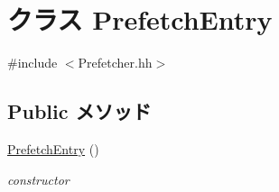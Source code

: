 \hypertarget{classPrefetchEntry}{
\section{クラス PrefetchEntry}
\label{classPrefetchEntry}
}


{\ttfamily \#include $<$Prefetcher.hh$>$}\subsection*{Public メソッド}
\begin{DoxyCompactItemize}
\item 
\hyperlink{classPrefetchEntry_a50ec5ab4d2e06f3dbfd82cc2590a574d}{PrefetchEntry} ()
\begin{DoxyCompactList}\small\item\em constructor \item\end{DoxyCompactList}\end{DoxyCompactItemize}
